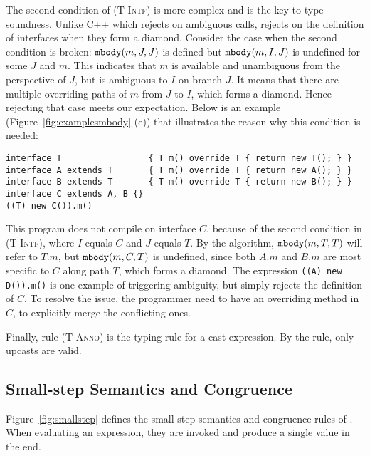 The second condition of \textsc{(T-Intf)} is more complex and is the key to type soundness. Unlike C++ which rejects on ambiguous calls,
\MIM{} rejects on the definition of interfaces when they form a diamond. Consider the case when the second condition is broken: $\texttt{mbody}(m, J, J)$
is defined but $\texttt{mbody}(m, I, J)$ is undefined for some $J$ and $m$. This indicates that $m$ is available and unambiguous from the perspective of $J$,
but is ambiguous to $I$ on branch $J$. It means that there are multiple overriding paths of $m$ from $J$ to $I$, which forms a diamond. Hence rejecting
that case meets our expectation. Below is an example (Figure~\ref{fig:examplesmbody} (e)) that illustrates the reason why this condition is needed:
\begin{lstlisting}
interface T                 { T m() override T { return new T(); } }
interface A extends T       { T m() override T { return new A(); } }
interface B extends T       { T m() override T { return new B(); } }
interface C extends A, B {}
((T) new C()).m()
\end{lstlisting}
This program does not compile on interface $C$, because of the second condition in \textsc{(T-Intf)}, where $I$ equals $C$ and $J$ equals $T$.
By the algorithm, $\texttt{mbody}(m, T, T)$ will refer to $T.m$, but $\texttt{mbody}(m, C, T)$ is undefined, since both $A.m$ and $B.m$ are most specific
to $C$ along path $T$, which forms a diamond. The expression \lstinline|((A) new D()).m()| is one example of triggering ambiguity, but \MIM{}
simply rejects the definition of $C$. To resolve the issue, the programmer need to have an overriding method in $C$, to explicitly merge
the conflicting ones.

Finally, rule \textsc{(T-Anno)} is the typing rule for a cast expression. By the rule, only upcasts are valid.

\subsection{Small-step Semantics and Congruence}
Figure~\ref{fig:smallstep} defines the small-step semantics and
congruence rules of \MIM{}. When evaluating an expression, they
are invoked and produce a single value in
the end. %

